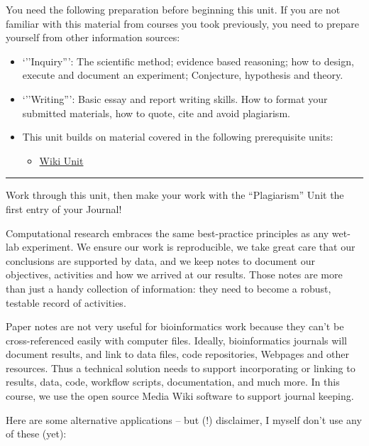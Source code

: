 \documentclass[]{book}
\providecommand{\tightlist}{%
  \setlength{\itemsep}{0pt}\setlength{\parskip}{0pt}}
\begin{document}
You need the following preparation before beginning this unit. If you
are not familiar with this material from courses you took previously,
you need to prepare yourself from other information sources:

\begin{itemize}
\tightlist
\item
  `''Inquiry''': The scientific method; evidence based reasoning; how to
  design, execute and document an experiment; Conjecture, hypothesis and
  theory.
\item
  `''Writing''': Basic essay and report writing skills. How to format
  your submitted materials, how to quote, cite and avoid plagiarism.
\item
  This unit builds on material covered in the following prerequisite
  units:

  \begin{itemize}
  \tightlist
  \item
    \protect\hyperlink{wiki}{Wiki Unit}
  \end{itemize}
\end{itemize}

\begin{center}\rule{0.5\linewidth}{\linethickness}\end{center}

Work through this unit, then make your work with the ``Plagiarism'' Unit
the first entry of your Journal!

Computational research embraces the same best-practice principles as any
wet-lab experiment. We ensure our work is reproducible, we take great
care that our conclusions are supported by data, and we keep notes to
document our objectives, activities and how we arrived at our results.
Those notes are more than just a handy collection of information: they
need to become a robust, testable record of activities.

Paper notes are not very useful for bioinformatics work because they
can't be cross-referenced easily with computer files. Ideally,
bioinformatics journals will document results, and link to data files,
code repositories, Webpages and other resources. Thus a technical
solution needs to support incorporating or linking to results, data,
code, workflow scripts, documentation, and much more. In this course, we
use the open source Media Wiki software to support journal keeping.

Here are some alternative applications -- but (!) disclaimer, I myself
don't use any of these (yet):
\end{document}
